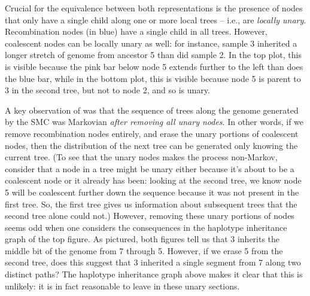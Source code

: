 \documentclass{article}
\begin{document}
Crucial for the equivalence between both representations is the presence of
nodes that only have a single child along one or more local trees --
i.e., are \emph{locally unary}.
Recombination nodes (in blue) have a single child in all trees.
However, coalescent nodes can be locally unary as well:
for instance, sample 3 inherited a longer stretch of genome from ancestor 5
than did sample 2.
In the top plot, this is visible because the pink bar below node 5
extends further to the left than does the blue bar,
while in the bottom plot, this is visible because node 5 is parent to 3
in the second tree, but not to node 2, and so is unary.

A key observation of \citet{mcvean_approximating_2005}
was that the sequence of trees along the genome
generated by the SMC was Markovian \emph{after removing all unary nodes}.
In other words, if we remove recombination nodes entirely,
and erase the unary portions of coalescent nodes,
then the distribution of the next tree can be generated only knowing the current tree.
(To see that the unary nodes makes the process non-Markov,
consider that a node in a tree might be unary either because it's about to be a coalescent node
or it already has been:
looking at the second tree, we know node 5 will be coalescent further down the sequence
because it was not present in the first tree.
So, the first tree gives us information about subsequent trees
that the second tree alone could not.)
However, removing these unary portions of nodes seems odd
when one considers the consequences in the haplotype inheritance graph
of the top figure.
As pictured, both figures tell us that
3 inherits the middle bit of the genome from 7 through 5.
However, if we erase 5 from the second tree,
does this suggest that 3 inherited a single segment from 7 along two distinct paths?
The haplotype inheritance graph above makes it clear that this is unlikely:
it is in fact reasonable to leave in these unary sections.
\end{document}
